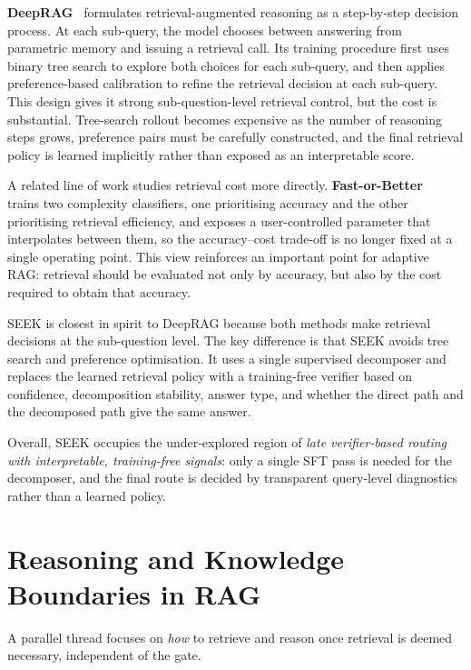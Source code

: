 \textbf{DeepRAG}~\cite{deeprag} formulates retrieval-augmented reasoning as a step-by-step decision process. At each sub-query, the model chooses between answering from parametric memory and issuing a retrieval call. Its training procedure first uses binary tree search to explore both choices for each sub-query, and then applies preference-based calibration to refine the retrieval decision at each sub-query. This design gives it strong sub-question-level retrieval control, but the cost is substantial. Tree-search rollout becomes expensive as the number of reasoning steps grows, preference pairs must be carefully constructed, and the final retrieval policy is learned implicitly rather than exposed as an interpretable score.

A related line of work studies retrieval cost more directly. \textbf{Fast-or-Better}~\cite{fastorbetter} trains two complexity classifiers, one prioritising accuracy and the other prioritising retrieval efficiency, and exposes a user-controlled parameter that interpolates between them, so the accuracy--cost trade-off is no longer fixed at a single operating point. This view reinforces an important point for adaptive RAG: retrieval should be evaluated not only by accuracy, but also by the cost required to obtain that accuracy.

SEEK is closest in spirit to DeepRAG because both methods make retrieval decisions at the sub-question level. The key difference is that SEEK avoids tree search and preference optimisation. It uses a single supervised decomposer and replaces the learned retrieval policy with a training-free verifier based on confidence, decomposition stability, answer type, and whether the direct path and the decomposed path give the same answer.

Overall, SEEK occupies the under-explored region of \emph{late verifier-based routing with interpretable, training-free signals}: only a single SFT pass is needed for the decomposer, and the final route is decided by transparent query-level diagnostics rather than a learned policy.

\section{Reasoning and Knowledge Boundaries in RAG}
\label{sec:reasoning-rag}
\label{sec:knowledge-boundary}

A parallel thread focuses on \emph{how} to retrieve and reason once retrieval is deemed necessary, independent of the gate.

